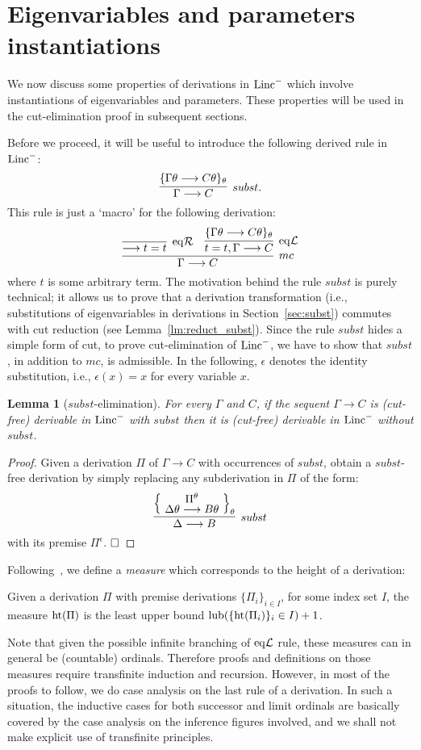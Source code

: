 \documentclass[preprint]{elsarticle}
\newcommand{\Linc}{{\rm Linc}^-}
\newcommand{\Seq}[2]{#1\longrightarrow #2}
\newcommand{\eqL}{{\rm eq}{\cal L}}
\newcommand{\eqR}{{\rm eq}{\cal R}}
\newcommand{\lub}[1]{{\rm lub}(#1)}
\newcommand{\measure}[1]{{\rm ht}(#1)}
\newtheorem{lemma}[thm]{Lemma}
\def\qed{$\hfill\Box$}
\begin{document}
\section{Eigenvariables and parameters instantiations}
\label{sec:drv}

We now discuss some properties of derivations in $\Linc$ which involve
instantiations of eigenvariables and parameters. These properties will
be used in the cut-elimination proof in subsequent sections.  

Before we proceed, it will be useful to introduce the following 
derived rule in $\Linc$: 
$$
\infer[subst.]
{\Seq{\Gamma}{C}}
{
\{ \Seq{\Gamma\theta}{C\theta}\}_\theta
}
$$
This rule is just a `macro' for the following derivation:
$$
\infer[mc]
{\Seq{\Gamma}{C}}
{
\infer[\eqR]
{\Seq{}{t=t}}{}
&
\infer[\eqL]
 {\Seq{t=t,\Gamma}{C}}
 {
  \{\Seq{\Gamma\theta}{C\theta}\}_\theta
 }
}
$$
where $t$ is some arbitrary term. The motivation behind the 
rule $subst$ is purely technical; it allows us to prove that
a derivation transformation (i.e., substitutions of eigenvariables
in derivations in Section~\ref{sec:subst}) commutes with cut reduction (see Lemma~\ref{lm:reduct_subst}).
Since the rule $subst$ hides a simple form of cut, to prove cut-elimination
of $\Linc$, we have to show that $subst$, in addition to $mc$, 
is admissible. In the following, $\epsilon$ denotes the identity substitution,
i.e., $\epsilon(x)=x$ for every variable $x$.

\begin{lemma}[$subst$-elimination]
\label{lm:subst-elimination}
For every $\Gamma$ and $C$, if the sequent $\Seq{\Gamma}{C}$
is (cut-free) derivable in $\Linc$ with $subst$ then it is (cut-free)
derivable in $\Linc$ without $subst$.
\end{lemma}
\begin{proof}
Given a derivation $\Pi$ of $\Seq{\Gamma}{C}$ with occurrences of $subst$,
obtain a $subst$-free derivation by simply replacing 
any subderivation in $\Pi$ of the form:
$$
\infer[subst]
{\Seq{\Delta}{B}}
{
\left\{
\raisebox{-1.3ex}{
\deduce{\Seq{\Delta\theta}{B\theta}}{\Pi^\theta}
}
\right\}_\theta
}
$$
with its premise $\Pi^\epsilon$.
\qed
\end{proof}

Following~\cite{mcdowell00tcs}, we define a \emph{measure} which
corresponds to the height of a derivation:
\begin{definition}
  \label{def:mu}
  Given a derivation $\Pi$ with premise derivations $\{\Pi_i\}_{i \in
    I}$, for some index set $I$, the measure $\measure{\Pi}$ is the
  least upper bound $\lub {\{\measure{\Pi_i}\}_i\in I} + 1$.
\end{definition}
Note that given the possible infinite branching of $\eqL$ rule, these
measures can in general be (countable) ordinals.  Therefore proofs and
definitions on those measures require transfinite induction and
recursion. However, in most of the proofs to follow, we do case
analysis on the last rule of a derivation. In such a situation, the
inductive cases for both successor and limit ordinals are basically
covered by the case analysis on the inference figures involved, and we
shall not make explicit use of transfinite principles.
\end{document}
